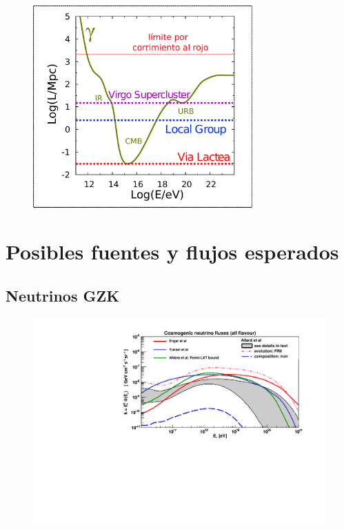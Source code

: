 \begin{figure}[ht]
	\begin{center}
	\includegraphics[width=0.75\textwidth]{fig/introduccion/photon_propaga_espanol}
	\caption{\label{fig:photProp} }
	\end{center}
\end{figure}

\section{Posibles fuentes y flujos esperados}

	\subsection{Neutrinos GZK}

	\begin{figure}[ht]
		\begin{center}
		\includegraphics[width=\textwidth]{fig/introduccion/gzk_fluxes}
		\caption{\label{fig:flujosGZK} }
		\end{center}
	\end{figure}
	
